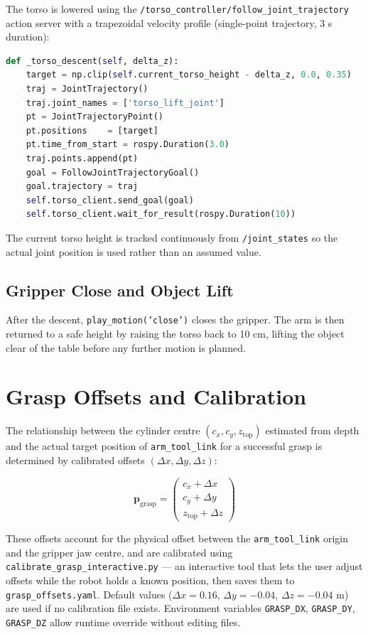 The torso is lowered using the \texttt{/torso\_controller/follow\_joint\_trajectory}
action server with a trapezoidal velocity profile (single-point trajectory, 3 s duration):

\begin{lstlisting}[language=Python, caption={Torso descent implementation.}]
def _torso_descent(self, delta_z):
    target = np.clip(self.current_torso_height - delta_z, 0.0, 0.35)
    traj = JointTrajectory()
    traj.joint_names = ['torso_lift_joint']
    pt = JointTrajectoryPoint()
    pt.positions    = [target]
    pt.time_from_start = rospy.Duration(3.0)
    traj.points.append(pt)
    goal = FollowJointTrajectoryGoal()
    goal.trajectory = traj
    self.torso_client.send_goal(goal)
    self.torso_client.wait_for_result(rospy.Duration(10))
\end{lstlisting}

The current torso height is tracked continuously from \texttt{/joint\_states} so
the actual joint position is used rather than an assumed value.

\subsection{Gripper Close and Object Lift}

After the descent, \texttt{play\_motion('close')} closes the gripper.
The arm is then returned to a safe height by raising the torso back to 10 cm, lifting
the object clear of the table before any further motion is planned.

\section{Grasp Offsets and Calibration}

The relationship between the cylinder centre $(c_x, c_y, z_{\text{top}})$ estimated
from depth and the actual target position of \texttt{arm\_tool\_link} for a successful
grasp is determined by calibrated offsets $(\Delta x, \Delta y, \Delta z)$:

\begin{equation}
  \mathbf{p}_{\text{grasp}} =
  \begin{pmatrix} c_x + \Delta x \\ c_y + \Delta y \\ z_{\text{top}} + \Delta z \end{pmatrix}
\end{equation}

These offsets account for the physical offset between the \texttt{arm\_tool\_link}
origin and the gripper jaw centre, and are calibrated using
\texttt{calibrate\_grasp\_interactive.py} — an interactive tool that lets the user
adjust offsets while the robot holds a known position, then saves them to
\texttt{grasp\_offsets.yaml}.
Default values ($\Delta x = 0.16$, $\Delta y = -0.04$, $\Delta z = -0.04$ m) are used
if no calibration file exists.
Environment variables \texttt{GRASP\_DX}, \texttt{GRASP\_DY}, \texttt{GRASP\_DZ}
allow runtime override without editing files.

